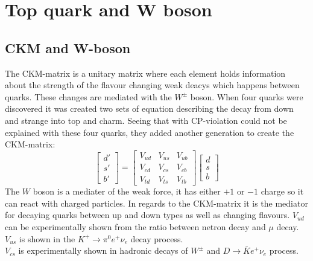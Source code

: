 \section{Top quark and W boson}
  \subsection{CKM and W-boson}
	The CKM-matrix is a unitary matrix where each element holds information about the
      	strength of the flavour changing weak deacys which happens between quarks.
      	These changes are mediated with the $W^{\pm}$ boson.
      	When four quarks were discovered it was created two sets of equation describing
      	the decay from down and strange into top and charm.
      	Seeing that with CP-violation could not be explained with these four quarks,
      	they added another generation to create the CKM-matrix:
      	\begin{equation}
      	\begin{bmatrix}
      	  d'\\
      	  s'\\
      	  b'
      	\end{bmatrix}
      	=
      	\begin{bmatrix}
      	  V_{ud} & V_{us} & V_{ub} \\
      	  V_{cd} & V_{cs} & V_{cb} \\
      	  V_{td} & V_{ts} & V_{tb} 
      	\end{bmatrix}
      	\begin{bmatrix}
      	  d\\
      	  s\\
      	  b
      	\end{bmatrix}
      	\end{equation}
      	The $W$ boson is a mediater of the weak force, it has either $+1$ or $-1$ charge so it
	can react with charged particles. In regards to the CKM-matrix it is the mediator for
	decaying quarks between up and down types as well as changing flavours.
	$V_{ud}$ can be experimentally shown from the ratio between netron decay and
	$\mu$ decay.\\
	$V_{us}$ is shown in the $K^+ \rightarrow \pi^0 e^+ \nu_e$ decay process.\\
	$V_{cs}$ is experimentally shown in hadronic decays of $W^{\pm}$ and 
	$D\rightarrow \bar{K}e^+\nu_e$ process.

